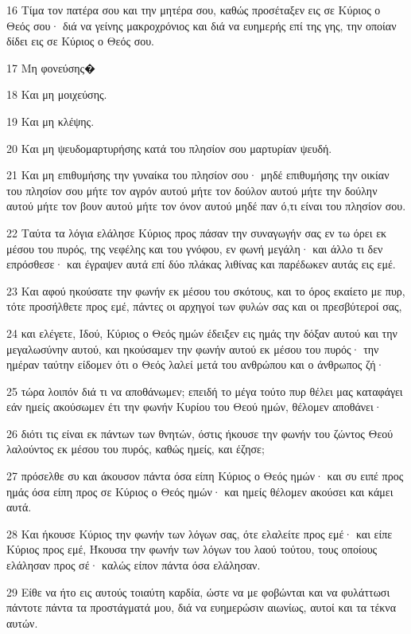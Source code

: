 \par 16 Τίμα τον πατέρα σου και την μητέρα σου, καθώς προσέταξεν εις σε Κύριος ο Θεός σου· διά να γείνης μακροχρόνιος και διά να ευημερής επί της γης, την οποίαν δίδει εις σε Κύριος ο Θεός σου.
\par 17 Μη φονεύσης�
\par 18 Και μη μοιχεύσης.
\par 19 Και μη κλέψης.
\par 20 Και μη ψευδομαρτυρήσης κατά του πλησίον σου μαρτυρίαν ψευδή.
\par 21 Και μη επιθυμήσης την γυναίκα του πλησίον σου· μηδέ επιθυμήσης την οικίαν του πλησίον σου μήτε τον αγρόν αυτού μήτε τον δούλον αυτού μήτε την δούλην αυτού μήτε τον βουν αυτού μήτε τον όνον αυτού μηδέ παν ό,τι είναι του πλησίον σου.
\par 22 Ταύτα τα λόγια ελάλησε Κύριος προς πάσαν την συναγωγήν σας εν τω όρει εκ μέσου του πυρός, της νεφέλης και του γνόφου, εν φωνή μεγάλη· και άλλο τι δεν επρόσθεσε· και έγραψεν αυτά επί δύο πλάκας λιθίνας και παρέδωκεν αυτάς εις εμέ.
\par 23 Και αφού ηκούσατε την φωνήν εκ μέσου του σκότους, και το όρος εκαίετο με πυρ, τότε προσήλθετε προς εμέ, πάντες οι αρχηγοί των φυλών σας και οι πρεσβύτεροί σας,
\par 24 και ελέγετε, Ιδού, Κύριος ο Θεός ημών έδειξεν εις ημάς την δόξαν αυτού και την μεγαλωσύνην αυτού, και ηκούσαμεν την φωνήν αυτού εκ μέσου του πυρός· την ημέραν ταύτην είδομεν ότι ο Θεός λαλεί μετά του ανθρώπου και ο άνθρωπος ζή·
\par 25 τώρα λοιπόν διά τι να αποθάνωμεν; επειδή το μέγα τούτο πυρ θέλει μας καταφάγει εάν ημείς ακούσωμεν έτι την φωνήν Κυρίου του Θεού ημών, θέλομεν αποθάνει·
\par 26 διότι τις είναι εκ πάντων των θνητών, όστις ήκουσε την φωνήν του ζώντος Θεού λαλούντος εκ μέσου του πυρός, καθώς ημείς, και έζησε;
\par 27 πρόσελθε συ και άκουσον πάντα όσα είπη Κύριος ο Θεός ημών· και συ ειπέ προς ημάς όσα είπη προς σε Κύριος ο Θεός ημών· και ημείς θέλομεν ακούσει και κάμει αυτά.
\par 28 Και ήκουσε Κύριος την φωνήν των λόγων σας, ότε ελαλείτε προς εμέ· και είπε Κύριος προς εμέ, Ήκουσα την φωνήν των λόγων του λαού τούτου, τους οποίους ελάλησαν προς σέ· καλώς είπον πάντα όσα ελάλησαν.
\par 29 Είθε να ήτο εις αυτούς τοιαύτη καρδία, ώστε να με φοβώνται και να φυλάττωσι πάντοτε πάντα τα προστάγματά μου, διά να ευημερώσιν αιωνίως, αυτοί και τα τέκνα αυτών.
